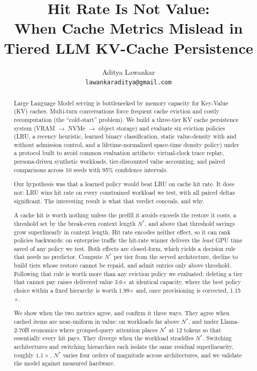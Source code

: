 \documentclass[letterpaper,twocolumn,10pt]{article}
\title{\Large \bf Hit Rate Is Not Value:\\
When Cache Metrics Mislead in\\
Tiered LLM KV-Cache Persistence}
\author{
  {\rm Aditya Lawankar} \\
  \texttt{lawankaraditya@gmail.com}
}
\date{}
\begin{document}
\maketitle

\begin{abstract}
Large Language Model serving is bottlenecked by memory capacity for Key-Value (KV) caches. Multi-turn conversations force frequent cache eviction and costly recomputation (the ``cold-start'' problem). We build a three-tier KV cache persistence system (VRAM $\to$ NVMe $\to$ object storage) and evaluate six eviction policies (LRU, a recency heuristic, learned binary classification, static value-density with and without admission control, and a lifetime-normalized space-time density policy) under a protocol built to avoid common evaluation artifacts: virtual-clock trace replay, persona-driven synthetic workloads, tier-discounted value accounting, and paired comparisons across 10 seeds with 95\% confidence intervals.

Our hypothesis was that a learned policy would beat LRU on cache hit rate. It does not: LRU wins hit rate on every constrained workload we test, with all paired deltas significant. The interesting result is what that verdict conceals, and why.

A cache hit is worth nothing unless the prefill it avoids exceeds the restore it costs, a threshold set by the break-even context length $N^{*}$, and above that threshold savings grow superlinearly in context length. Hit rate encodes neither effect, so it can rank policies backwards: on enterprise traffic the hit-rate winner delivers the \emph{least} GPU time saved of any policy we test. Both effects are closed-form, which yields a decision rule that needs no predictor. Compute $N^{*}$ per tier from the served architecture, decline to build tiers whose restore cannot be repaid, and admit entries only above threshold. Following that rule is worth more than any eviction policy we evaluated: deleting a tier that cannot pay raises delivered value 3.6$\times$ at identical capacity, where the best policy choice within a fixed hierarchy is worth 1.99$\times$ and, once provisioning is corrected, 1.15$\times$.

We show when the two metrics agree, and confirm it three ways. They agree when cached items are near-uniform in value: on workloads far above $N^{*}$, and under Llama-2-70B economics where grouped-query attention places $N^{*}$ at 12 tokens so that essentially every hit pays. They diverge when the workload straddles $N^{*}$. Switching architectures and switching hierarchies each isolate the same residual superlinearity, roughly $1.1\times$. $N^{*}$ varies four orders of magnitude across architectures, and we validate the model against measured hardware.


\end{abstract}
\end{document}
